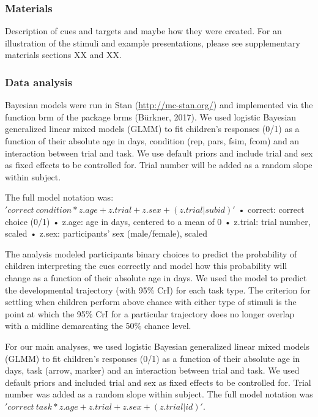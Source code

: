 \documentclass[
  man]{apa6}
\begin{document}
\subsubsection{Materials}\label{materials}

Description of cues and targets and maybe how they were created. For an illustration of the stimuli and example presentations, please see supplementary materials sections XX and XX.

\subsubsection{Data analysis}\label{data-analysis}

Bayesian models were run in Stan (\url{http://mc-stan.org/}) and implemented via the function brm of the package brms (Bürkner, 2017). We used logistic Bayesian generalized linear mixed models (GLMM) to fit children's responses (0/1) as a function of their absolute age in days, condition (rep, pars, fsim, fcom) and an interaction between trial and task. We use default priors and include trial and sex as fixed effects to be controlled for. Trial number will be added as a random slope within subject.

The full model notation was: \('correct~condition*z.age+z.trial+z.sex+(z.trial|subid)'\)
• correct: correct choice (0/1)
• z.age: age in days, centered to a mean of 0
• z.trial: trial number, scaled
• z.sex: participants' sex (male/female), scaled

The analysis modeled participants binary choices to predict the probability of children interpreting the cues correctly and model how this probability will change as a function of their absolute age in days. We used the model to predict the
developmental trajectory (with 95\% CrI) for each task type. The criterion for settling when children perform above chance with either type of stimuli is the point at which the 95\% CrI for a particular trajectory does no longer overlap with a midline demarcating the 50\% chance level.

For our main analyses, we used logistic Bayesian generalized linear mixed models (GLMM) to fit children's responses (0/1) as a function of their absolute age in days, task (arrow, marker) and an interaction between trial and task. We used default priors and included trial and sex as fixed effects to be controlled for. Trial number was added as a random slope within subject. The full model notation was \('correct ~ task*z.age +z.trial +z.sex +(z.trial|id)'\).
\end{document}
